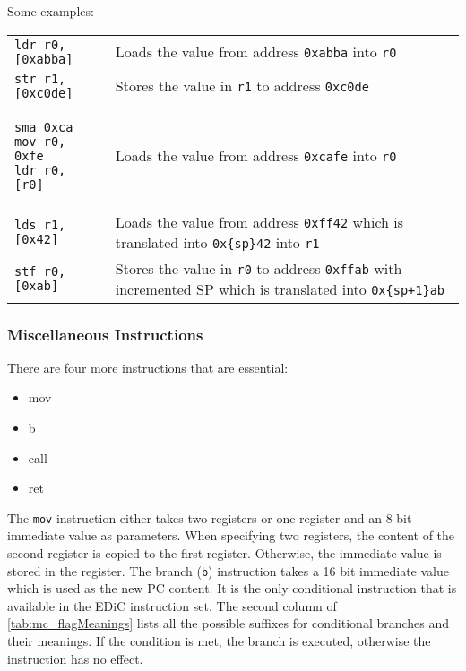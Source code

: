 Some examples:

\begin{tabular}{m{}m{}}
  \texttt{ldr r0, [0xabba]} & Loads the value from address \texttt{0xabba} into \texttt{r0}                                                                       \\
  \texttt{str r1, [0xc0de]} & Stores the value in \texttt{r1} to address \texttt{0xc0de}                                                                          \\
  \begin{verbatim}
sma 0xca
mov r0, 0xfe
ldr r0, [r0]
  \end{verbatim}
                                     & Loads the value from address \texttt{0xcafe} into \texttt{r0}                                                                       \\
  \texttt{lds r1, [0x42]}   & Loads the value from address \texttt{0xff42} which is translated into \texttt{0x\{sp\}42} into \texttt{r1}                         \\
  \texttt{stf r0, [0xab]}   & Stores the value in \texttt{r0} to address \texttt{0xffab} with incremented \gls{SP} which is translated into \texttt{0x\{sp+1\}ab} \\
\end{tabular}

\subsubsection{Miscellaneous Instructions}
There are four more instructions that are essential:

\begin{multicols}{4}
  \begin{itemize}
    \item mov
    \item b
    \item call
    \item ret
  \end{itemize}
\end{multicols}
The \texttt{mov} instruction either takes two registers or one register and an 8 bit immediate value as parameters.
When specifying two registers, the content of the second register is copied to the first register.
Otherwise, the immediate value is stored in the register.
The branch (\texttt{b}) instruction takes a 16 bit immediate value which is used as the new \gls{PC} content.
It is the only conditional instruction that is available in the \gls{EDiC} instruction set.
The second column of \cref{tab:mc_flagMeanings} lists all the possible suffixes for conditional branches and their meanings.
If the condition is met, the branch is executed, otherwise the instruction has no effect.

